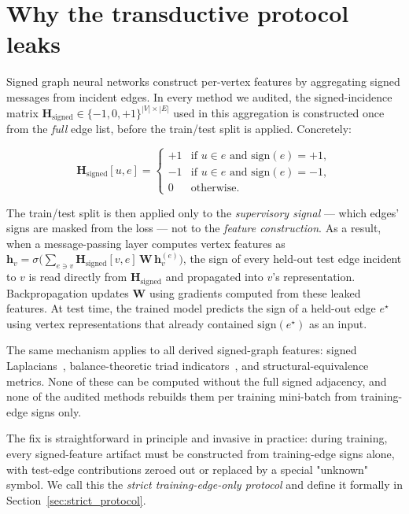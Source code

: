 \documentclass[11pt]{article}
\begin{document}
\section{Why the transductive protocol leaks}

\label{sec:mechanism}

Signed graph neural networks construct per-vertex features by
aggregating signed messages from incident edges. In every method we
audited, the signed-incidence matrix
$\mathbf{H}_{\mathrm{signed}} \in \{-1, 0, +1\}^{|V|\times|E|}$ used
in this aggregation is constructed once from the \emph{full} edge
list, before the train/test split is applied. Concretely:

\begin{equation}
\mathbf{H}_{\mathrm{signed}}[u, e] = \begin{cases}
+1 & \text{if } u \in e \text{ and } \mathrm{sign}(e) = +1, \\
-1 & \text{if } u \in e \text{ and } \mathrm{sign}(e) = -1, \\
0  & \text{otherwise.}
\end{cases}
\end{equation}

The train/test split is then applied only to the \emph{supervisory
signal} --- which edges' signs are masked from the loss --- not to
the \emph{feature construction}. As a result, when a message-passing
layer computes vertex features as
$\mathbf{h}_v = \sigma\!\bigl(\sum_{e\ni v} \mathbf{H}_{\mathrm{signed}}[v, e]\,
\mathbf{W}\,\mathbf{h}_v^{(e)}\bigr)$,
the sign of every held-out test edge incident to $v$ is read directly
from $\mathbf{H}_{\mathrm{signed}}$ and propagated into $v$'s
representation. Backpropagation updates $\mathbf{W}$ using gradients
computed from these leaked features. At test time, the trained model
predicts the sign of a held-out edge $e^\star$ using vertex
representations that already contained $\mathrm{sign}(e^\star)$ as
an input.

The same mechanism applies to all derived signed-graph features:
signed Laplacians~\cite{sgcn2018}, balance-theoretic triad
indicators~\cite{cartwright1956}, and structural-equivalence
metrics. None of these can be computed without the full signed
adjacency, and none of the audited methods rebuilds them per training
mini-batch from training-edge signs only.

The fix is straightforward in principle and invasive in practice:
during training, every signed-feature artifact must be constructed
from training-edge signs alone, with test-edge contributions zeroed
out or replaced by a special "unknown" symbol. We call this the
\emph{strict training-edge-only protocol} and define it formally in
Section~\ref{sec:strict_protocol}.
\end{document}

